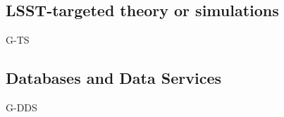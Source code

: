 \subsection{LSST-targeted theory or simulations} \label{sec:tasks:gal:simulations}

\begin{tasklist}{G-TS}
\begin{task}
\label{task:gal:image_simulations}
\motivation{}
\activities{}
\deliverables{}
\end{task}

\begin{task}
\label{task:gal:rare_objects}
\motivation{}
\activities{}
\deliverables{}
\end{task}

\begin{task}
\label{task:gal:cv_estimators}
\motivation{}
\activities{}
\deliverables{}
\end{task}

\begin{task}
\label{task:gal:dwarf_sb_fluctuations}
\motivation{}
\activities{}
\deliverables{}
\end{task}

\begin{task}
\label{task:gal:group_finders}
\motivation{}
\activities{}
\deliverables{}
\end{task}

\end{tasklist}

\subsection{Databases and Data Services} \label{sec:tasks:gal:databases}

\begin{tasklist}{G-DDS}
\begin{task}
\label{task:gal:data_structures}
\motivation{}
\activities{}
\deliverables{}
\end{task}

\begin{task}
\label{task:gal:queries}
\motivation{}
\activities{}
\deliverables{}
\end{task}

\begin{task}
\label{task:gal:likelihoods}
\motivation{}
\activities{}
\end{task}

\end{tasklist}
